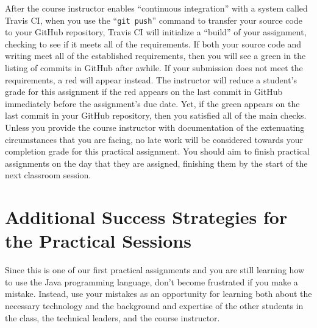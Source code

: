 \documentclass[11pt]{article}
\newcommand{\gitpush}{\command{git push}}
\newcommand{\command}[1]{``\lstinline{#1}''}
\newcommand{\step}[1]{``{#1}''}
\newcommand{\checkmark}{\ding{51}}
\newcommand{\naughtmark}{\ding{55}}
\begin{document}
After the course instructor enables \step{continuous integration} with a system
called Travis CI, when you use the \gitpush{} command to transfer your source
code to your GitHub repository, Travis CI will initialize a \step{build} of
your assignment, checking to see if it meets all of the requirements. If both
your source code and writing meet all of the established requirements, then you
will see a green \checkmark{} in the listing of commits in GitHub after awhile.
If your submission does not meet the requirements, a red \naughtmark{} will
appear instead. The instructor will reduce a student's grade for this
assignment if the red \naughtmark{} appears on the last commit in GitHub
immediately before the assignment's due date. Yet, if the green \checkmark{}
appears on the last commit in your GitHub repository, then you satisfied all of
the main checks. Unless you provide the course instructor with documentation of
the extenuating circumstances that you are facing, no late work will be
considered towards your completion grade for this practical assignment. You
should aim to finish practical assignments on the day that they are assigned,
finishing them by the start of the next classroom session.


\section*{Additional Success Strategies for the Practical Sessions}

Since this is one of our first practical assignments and you are still learning
how to use the Java programming language, don't become frustrated if you make a
mistake. Instead, use your mistakes as an opportunity for learning both about
the necessary technology and the background and expertise of the other students
in the class, the technical leaders, and the course instructor.
\end{document}
